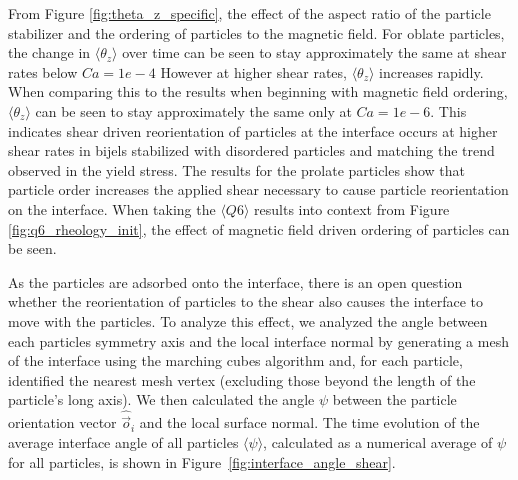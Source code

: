 From Figure \ref{fig:theta_z_specific}, the effect of the aspect ratio of the particle stabilizer and the ordering of particles to the magnetic field. For oblate 
particles, the change in $\langle \theta_z \rangle$ over time can be seen to stay approximately the same at shear rates below $Ca = 1e-4$ However at higher shear rates,
$\langle \theta_z \rangle$ increases rapidly. When comparing this to the results when beginning with magnetic field ordering, $\langle \theta_z \rangle$ can be seen to
stay approximately the same only at $Ca = 1e-6$. This indicates shear driven reorientation of particles at the interface occurs at higher shear rates in bijels stabilized
with disordered particles and matching the trend observed in the yield stress. The results for the prolate particles show that particle order increases the applied shear
necessary to cause particle reorientation on the interface. When taking the $\langle Q6 \rangle$ results into context from Figure \ref{fig:q6_rheology_init}, 
the effect of magnetic field driven ordering of particles can be seen.

As the particles are adsorbed onto the interface, there is an open question whether the reorientation of particles to the shear also causes the interface to move with the
particles. To analyze this effect, we analyzed the angle between each particles symmetry axis and the local interface normal by generating a mesh of the interface using the marching 
cubes algorithm and, for each particle, identified the nearest mesh vertex (excluding those beyond the length of the particle's long axis). We then calculated 
the angle $\psi$ between the particle orientation vector \(\hat{\vec{o}}_i\) and the local surface normal. The time evolution of the average interface
angle of all particles $\langle \psi \rangle$, calculated as a numerical average of $\psi$ for all particles, is shown in Figure~\ref{fig:interface_angle_shear}.

